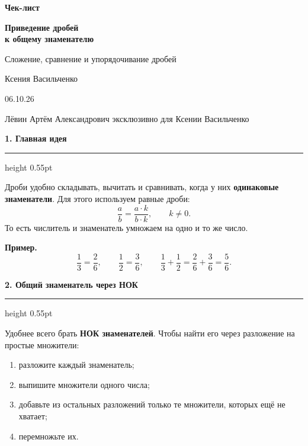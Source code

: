 \documentclass[a4paper,12pt]{article}
\newcommand{\sectiontitle}[1]{%
  \vspace{0.2em}%
  {\large\bfseries\color{darkaccent}#1}\par
  \vspace{0.08em}\hrule height 0.55pt\vspace{0.42em}%
}
\newcommand{\key}[1]{\textbf{\color{darkaccent}#1}}
\begin{document}
\begin{titlepage}
\thispagestyle{empty}
\centering
\vspace*{2.5cm}

{\color{darkaccent}\bfseries\LARGE Чек-лист\par}
\vspace{0.55cm}
{\bfseries\Huge Приведение дробей\\к общему знаменателю\par}
\vspace{1.0cm}
{\Large Сложение, сравнение и упорядочивание дробей\par}

\vfill
{\large Ксения Васильченко\par}
\vspace{0.35cm}
{\large 06.10.26\par}
\vspace{1.1cm}
{\normalsize\color{textgray}Лёвин Артём Александрович эксклюзивно для Ксении Васильченко\par}

\vfill
{}
\end{titlepage}

\sectiontitle{1. Главная идея}

Дроби удобно складывать, вычитать и сравнивать, когда у них \key{одинаковые знаменатели}. Для этого используем равные дроби:
\[
\frac{a}{b}=\frac{a\cdot k}{b\cdot k},\qquad k\ne0.
\]
То есть числитель и знаменатель умножаем на одно и то же число.

\textbf{Пример.}
\[
\frac13=\frac26,\qquad \frac12=\frac36,
\qquad
\frac13+\frac12=\frac26+\frac36=\frac56.
\]

\sectiontitle{2. Общий знаменатель через НОК}

Удобнее всего брать \key{НОК знаменателей}. Чтобы найти его через разложение на простые множители:
\begin{enumerate}
  \item разложите каждый знаменатель;
  \item выпишите множители одного числа;
  \item добавьте из остальных разложений только те множители, которых ещё не хватает;
  \item перемножьте их.
\end{enumerate}
\end{document}
